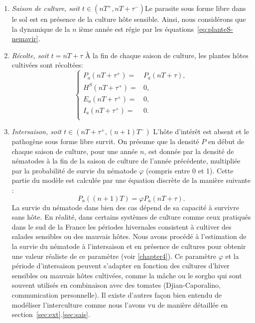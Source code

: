 \begin{enumerate}
\item \emph{Saison de culture, soit $t\in(nT^+,nT+\tau^-)$}\quad  Le parasite sous forme libre dans le sol est en    
présence de la culture hôte sensible. Ainsi, nous considérons que 
la dynamique de la $n$ ième année est régie par les équations~\eqref{eq:planteS-nemavir}. 
\item  \emph{Récolte, soit $t=nT+\tau$}\quad
À la fin de chaque saison de culture,  les plantes hôtes cultivées sont récoltées:
\begin{equation}
	\left\{
		\begin{aligned}
	    P_a (nT + \tau^+)=& P_a(nT + \tau),\\
		H^S (nT + \tau^+)=& 0,\\
		E_a (nT + \tau^+)=& 0,\\
		I_a (nT + \tau^+)=& 0.\\
		\end{aligned}
 \right.																		
\end{equation}    
\item  \emph{Intersaison, soit $t\in(nT+\tau^+,(n+1)T^-)$}\quad
L'hôte d'intérêt est absent et le pathogène sous forme libre survit.  On présume que la densité $P$ en début de chaque saison de culture, pour une année $n$, est donnée par la densité de nématodes à la fin de la saison de culture de l’année précédente, multipliée par la probabilité de  survie du nématode $\varphi$ (compris entre 0 et 1). Cette partie du modèle est calculée par une équation discrète de la manière suivante :
\begin{equation}
  P_a ((n+1)T)= \varphi P_a(nT + \tau).
  \label{eq:intersaison-planeS-nemavir}
\end{equation}  
La survie du nématode dans bien des cas dépend de sa capacité à survivre sans hôte. En réalité, dans certains systèmes de culture comme ceux pratiqués dans le sud de la France les périodes hivernales consistent à cultiver des salades sensibles ou des mauvais hôtes. Nous avons procédé à l’estimation de la survie du nématode à l'intersaison et en présence de cultures pour obtenir une valeur réaliste de ce paramètre (voir \autoref{chapter4}).  
Ce paramètre $\varphi$ et la période d'intersaison peuvent s'adapter en fonction des cultures d'hiver sensibles ou mauvais hôtes cultivées, comme la mâche ou le sorgho qui sont souvent utilisés en combinaison avec des tomates (Djian-Caporalino, communication personnelle). Il existe d'autres façon bien entendu de modéliser l'interculture comme nous l'avons vu de manière détaillée en section~\ref{sec:ext}.\ref{sec:sais}.

\end{enumerate}
